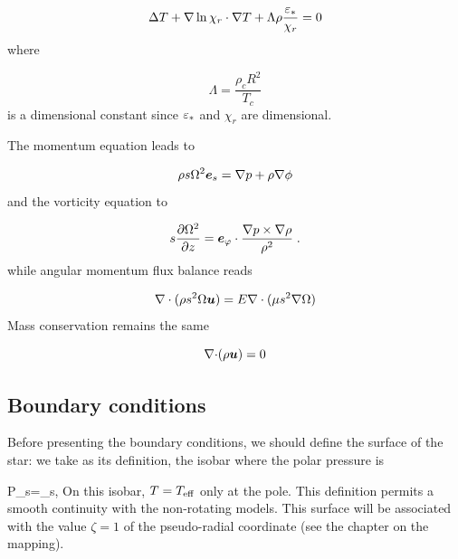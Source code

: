 \begin{equation} \Delta T + \nabla\ln\chi_r\cdot\nabla T +
\Lambda\rho\frac{\varepsilon_*}{\chi_r} = 0\end{equation}
where

\begin{equation} \Lambda = \frac{\rho_c R^2}{T_c}\end{equation}
is a dimensional constant since $\varepsilon_*$ and $\chi_r$ are dimensional. 

The momentum equation leads to

\begin{equation}
\rho s\Omega^2\es=\na p+\rho\na\phi
\label{baroc_nd}
\end{equation}
and the vorticity equation to

\begin{equation}
s\frac{\partial\Omega^2}{\partial z}=\ephi\cdot\frac{\na
p\times\na\rho}{\rho^2} \;.
\label{vort_nd}
\end{equation}
while angular momentum flux balance reads

\begin{equation}
\label{am_nd}
\na\cdot{(\rho s^2\Omega\vu)}=E\na\cdot (\mu s^2\na\Omega)
\end{equation}
Mass conservation remains the same

\begin{equation} \Div(\rho\vu) =0\end{equation}

\subsection{Boundary conditions}

Before presenting the boundary conditions, we should define the surface
of the star: we take as its definition, the isobar where the polar
pressure is 

\beq P_s=\tau_s,\eeq
On this isobar, $T=T_{\rm eff}$ only at the pole. This definition
permits a smooth continuity with the non-rotating models. This surface
will be associated with the value $\zeta=1$ of the pseudo-radial
coordinate (see the chapter on the mapping).

